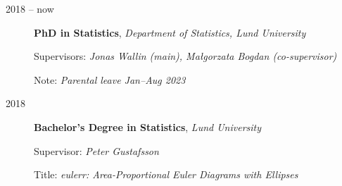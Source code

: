 \documentclass[english,a4paper]{article}
\renewcommand*{%
  \mkbibnamegiven
}[1]{\ifitemannotation{highlight}{\textbf{#1}}{#1}}
\renewcommand*{%
  \mkbibnamefamily
}[1]{\ifitemannotation{highlight}{\textbf{#1}}{#1}}
\begin{document}
\begin{description}
  \item[2018 -- now] {
    \textbf{PhD in Statistics}, \emph{Department of Statistics, Lund
      University}

    Supervisors: \emph{Jonas Wallin (main), Małgorzata Bogdan (co-supervisor)}

    Note: \emph{Parental leave Jan--Aug 2023}

    }

  \item[2018] {
    \textbf{Bachelor's Degree in Statistics}, \emph{Lund University}

    Supervisor: \emph{Peter Gustafsson}

    Title: \emph{eulerr: Area-Proportional Euler Diagrams with Ellipses}
    }






\end{description}




\end{document}
